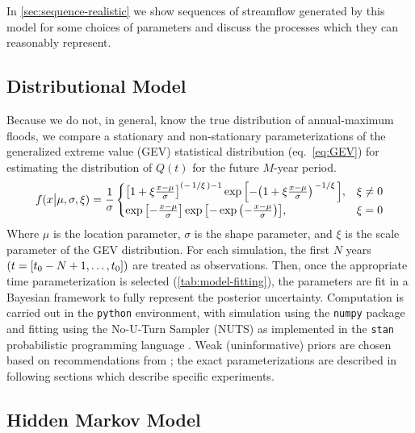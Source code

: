 \documentclass[11pt]{article}
\begin{document}
In \cref{sec:sequence-realistic} we show sequences of streamflow generated by this model for some choices of parameters and discuss the processes which they can reasonably represent.

\subsection{Distributional Model\label{sec:estimation}}

Because we do not, in general, know the true distribution of annual-maximum floods, we compare a stationary and non-stationary parameterizations of the generalized extreme value (GEV) statistical distribution (eq.~\ref{eq:GEV}) for estimating the distribution of \(Q(t)\) for the future \(M\)-year period.
\begin{equation}
  \label{eq:GEV}
  f(x \big| \mu, \sigma, \xi) = \frac{1}{\sigma}
    \begin{cases}
      \qty[1 + \xi \frac{x - \mu}{\sigma}] ^ {(-\flatfrac{1}{\xi})-1} \exp \qty[-\qty(1+\xi \frac{x - \mu}{\sigma})^{\flatfrac{-1}{\xi}}], & \xi \neq 0 \\
      \exp \qty[-\frac{x-\mu}{\sigma}] \exp \qty[- \exp \qty(- \frac{x-\mu}{\sigma})], & \xi = 0
    \end{cases}
\end{equation}
Where \(\mu{}\) is the location parameter, \(\sigma{}\) is the shape parameter, and \(\xi{}\) is the scale parameter of the GEV distribution.
For each simulation, the first \(N\) years \(\qty(t=[t_0-N+1, \ldots, t_0])\) are treated as observations.
Then, once the appropriate time parameterization is selected (\cref{tab:model-fitting}), the parameters are fit in a Bayesian framework to fully represent the posterior uncertainty.
Computation is carried out in the \texttt{python} environment, with simulation using the \texttt{numpy} package \citep{vanderWalt2011} and fitting using the No-U-Turn Sampler (NUTS) \citep{Hoffman2014} as implemented in the \texttt{stan} probabilistic programming language \citep{Carpenter2016}.
Weak (uninformative) priors are chosen based on recommendations from \citet{Martins2000}; the exact parameterizations are described in following sections which describe specific experiments.

\subsection{Hidden Markov Model\label{sec:HMM}}
\end{document}
